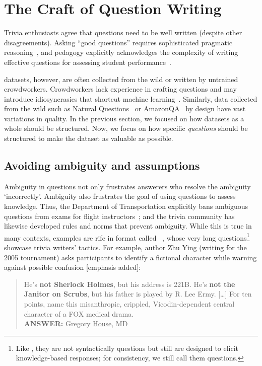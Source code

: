 \section{The Craft of Question Writing}
\label{sec:craft}

Trivia enthusiasts agree that questions need to be well written (despite other disagreements).
Asking ``good questions'' requires sophisticated pragmatic reasoning~\cite{hawkins-15}, and pedagogy explicitly acknowledges the complexity of writing effective questions for assessing student performance~\citep[focusing on multiple choice questions]{Haladyna-04}. 

 datasets, however, are often collected from the wild or written by untrained
crowdworkers.
Crowdworkers lack experience in 
crafting questions and may introduce idiosyncrasies that shortcut machine learning~\citep{geva-19}.  
Similarly, data collected from the wild
such as Natural Questions~\citep{kwiatkowski-19} or AmazonQA~\cite{gupta-19} by design have vast variations in quality.
In the previous section, we focused on how datasets as a whole should be structured.
Now, we focus on how specific \emph{questions} should be structured to make the dataset as valuable as possible.


\subsection{Avoiding ambiguity and assumptions}
\label{sec:ambiguity}

Ambiguity in questions not only frustrates answerers who resolve the ambiguity `incorrectly'.
Ambiguity also frustrates the goal of using questions to assess knowledge.
Thus, the  Department of Transportation explicitly bans ambiguous questions from exams for flight instructors~\cite{dot-08}; and the trivia community has likewise developed rules and norms that prevent ambiguity.
While this is true in many contexts, examples are rife in format called \qb{}~\cite{boyd-graber-12}, whose very long questions\footnote{Like \jeopardy{}, they are not syntactically questions but still are designed to elicit knowledge-based responses; for consistency, we still call them questions.} showcase trivia writers' tactics.
For example, \qb{} author Zhu Ying (writing for the 2005  tournament) asks participants to identify a fictional character while warning against possible confusion [emphasis added]:
\begin{quote}
 He's {\bf not Sherlock Holmes}, but his address is 221B. He's {\bf not the Janitor on Scrubs}, but his father is played by R. Lee Ermy. [\dots] For ten points, name this misanthropic, crippled, Vicodin-dependent central character of a FOX medical drama. \\
{\bf ANSWER:} Gregory \underline{House}, MD
\end{quote}

